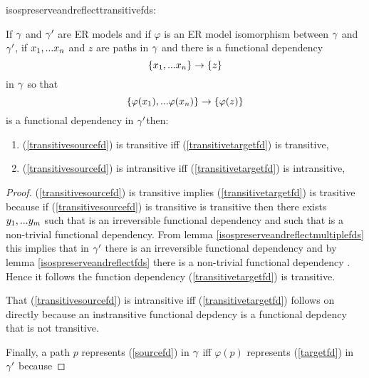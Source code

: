 isospreserveandreflecttransitivefds:
\begin{lemma}
\label{isospreserveandreflecttransitivefds}
If $\gamma$ and $\gamma'$ are ER models and  if  $\varphi$ is an ER model isomorphism between $\gamma$  and $\gamma'$,  if $x_1,...x_n$ and $z$ are paths in $\gamma$
and there is a  functional dependency
\begin{equation}
\label{transitivesourcefd}
\left\{x_1,...x_n\right\} \rightarrow \left\{z\right\}
\end{equation} 
in $\gamma$
so that
\begin{equation}
\label{transitivetargetfd}
\left\{\varphi(x_1),...\varphi(x_n)\right\} \rightarrow \left\{\varphi(z)\right\}
\end{equation}
is a functional dependency in $\gamma'$then:
\begin{enumerate}
\item (\ref{transitivesourcefd}) is  transitive iff (\ref{transitivetargetfd}) is transitive, 
\item (\ref{transitivesourcefd}) is  intransitive iff (\ref{transitivetargetfd}) is intransitive,

\end{enumerate}
\end{lemma}
\begin{proof}
\vspace{0.5cm}
(\ref{transitivesourcefd}) is transitive implies (\ref{transitivetargetfd}) 
is trasitive because if (\ref{transitivesourcefd}) is transitive is transitive then
there exists $y_1,...y_m$ such that
\fd{\xn}{\ym} is an irreversible functional dependency
and such that  is a non-trivial functional dependency.
From lemma \ref{isospreserveandreflectmultiplefds} this implies that in $\gamma'$ there is an 
\fd{\phixn}{\phiym} irreversible functional dependency \fd{\phixn}{\phiym}
and by lemma \ref{isospreserveandreflectfds} there is a non-trivial functional dependency \fd{\phiym}{\phiz}. Hence it follows
the function dependency (\ref{transitivetargetfd}) is transitive.

That (\ref{transitivesourcefd}) is  intransitive iff (\ref{transitivetargetfd}) follows on directly because an instransitive functional depdency is a functional depdency that is not transitive.

Finally, a path $p$ represents (\ref{sourcefd}) in $\gamma$ iff $\varphi(p)$ represents (\ref{targetfd}) in $\gamma'$
because

\end{proof}

